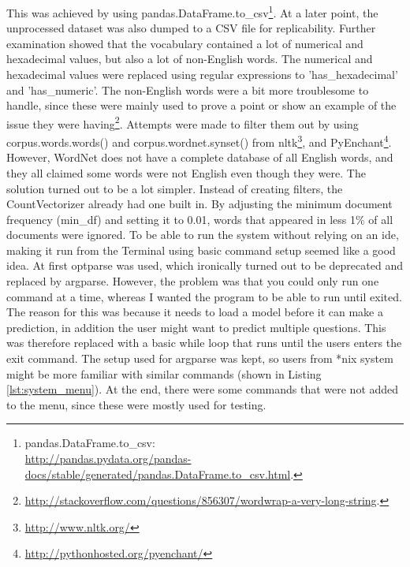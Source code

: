 This was achieved by using pandas.DataFrame.to\_csv\footnote{
	pandas.DataFrame.to\_csv: \\
	\url{http://pandas.pydata.org/pandas-docs/stable/generated/pandas.DataFrame.to_csv.html}.
	}. 
At a later point, the unprocessed dataset was also dumped to a CSV file for replicability.
\vspace{0.5em}\newline
Further examination showed that the vocabulary contained a lot of numerical and hexadecimal values, but also a lot of non-English words. 
The numerical and hexadecimal values were replaced using regular expressions to 'has\_hexadecimal' and 'has\_numeric'. 
The non-English words were a bit more troublesome to handle, since these were mainly used to prove a point or show an example of the issue they were having\footnote{ 
	\url{http://stackoverflow.com/questions/856307/wordwrap-a-very-long-string}.
	}. 
Attempts were made to filter them out by using corpus.words.words() and corpus.wordnet.synset() 
from \gls{nltk}\footnote{\url{http://www.nltk.org/}}, and PyEnchant\footnote{\url{http://pythonhosted.org/pyenchant/}}. 
However, WordNet does not have a complete database of all English words, and they all claimed some words were not English even though they were.
The solution turned out to be a lot simpler. 
Instead of creating filters, the CountVectorizer already had one built in. 
By adjusting the minimum document frequency (min\_df) and setting it to 0.01, words that appeared in less 1\% of all documents were ignored.
\vspace{0.5em}\newline
To be able to run the system without relying on an \gls{ide}, making it run from the Terminal using basic command setup seemed like a good idea. 
At first optparse was used, which ironically turned out to be deprecated and replaced by argparse. 
However, the problem was that you could only run one command at a time, whereas I wanted the program to be able to run until exited.
The reason for this was because it needs to load a model before it can make a prediction, in addition the user might want to predict multiple questions. 
This was therefore replaced with a basic while loop that runs until the users enters the exit command. 
The setup used for argparse was kept, so users from *nix system might be more familiar with similar commands (shown in Listing \ref{lst:system_menu}).
At the end, there were some commands that were not added to the menu, since these were mostly used for testing. 
